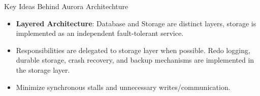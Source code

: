     \begin{frame}{Key Ideas Behind Aurora Architechture}
      \begin{itemize}
        \LARGE
        \item \textbf{Layered Architecture}: \pause Database and Storage are distinct layers, storage is implemented as an independent fault-tolerant service.
        \pause
        \item Responsibilities are delegated to storage layer when possible. Redo logging, durable storage, crash recovery, and backup mechanisms are implemented in the storage layer.
        \pause
        \item Minimize synchronous stalls and unnecessary writes/communication.
      \end{itemize}
    \end{frame}

